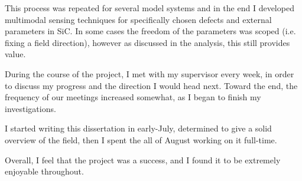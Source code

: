 This process was repeated for several model systems and in the end I developed multimodal sensing techniques for specifically chosen defects and external parameters in SiC. In some cases the freedom of the parameters was scoped (i.e. fixing a field direction), however as discussed in the analysis, this still provides value. 

During the course of the project, I met with my supervisor every week,
in order to discuss my progress and the direction I would head
next. Toward the end, the frequency of our meetings increased
somewhat, as I began to finish my investigations.

I started writing this dissertation in early-July, determined to give a solid overview of the field, then I spent the all of August working on it full-time.

Overall, I feel that the project was a success, and I found it to be
extremely enjoyable throughout.


